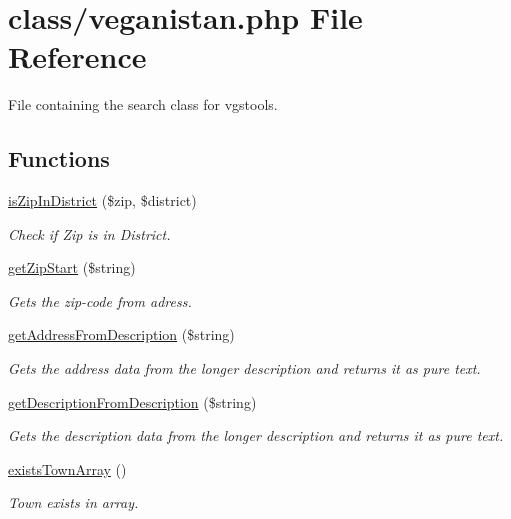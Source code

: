 \hypertarget{veganistan_8php}{}\section{class/veganistan.php File Reference}
\label{veganistan_8php}


File containing the search class for vgstools.  


\subsection*{Functions}
\begin{DoxyCompactItemize}
\item 
\hyperlink{veganistan_8php_a7a186816dd2b5975ec4a30160580dfe2}{is\+Zip\+In\+District} (\$zip, \$district)
\begin{DoxyCompactList}\small\item\em Check if Zip is in District. \end{DoxyCompactList}\item 
\hyperlink{veganistan_8php_a26c5d831dbe4c547a37559dc76d68c8b}{get\+Zip\+Start} (\$string)
\begin{DoxyCompactList}\small\item\em Gets the zip-\/code from adress. \end{DoxyCompactList}\item 
\hyperlink{veganistan_8php_af1239b1ab4bb8b28bde609484b92de75}{get\+Address\+From\+Description} (\$string)
\begin{DoxyCompactList}\small\item\em Gets the address data from the longer description and returns it as pure text. \end{DoxyCompactList}\item 
\hyperlink{veganistan_8php_ab53c3963282815bfc5db50f03053c497}{get\+Description\+From\+Description} (\$string)
\begin{DoxyCompactList}\small\item\em Gets the description data from the longer description and returns it as pure text. \end{DoxyCompactList}\item 
\hyperlink{veganistan_8php_ab9d8d11d7c212098c40df90c702d02e0}{exists\+Town\+Array} ()
\begin{DoxyCompactList}\small\item\em Town exists in array. \end{DoxyCompactList}\item 

\end{DoxyCompactItemize}
